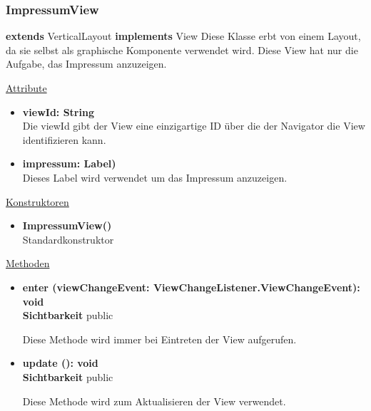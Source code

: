 \newpage
\subsubsection{ImpressumView}\label{ImpressumView}
\textbf{extends}  VerticalLayout \newline
\textbf{implements} View \newline
Diese Klasse erbt von einem Layout, da sie selbst als graphische Komponente verwendet wird. Diese View hat nur die Aufgabe, das Impressum anzuzeigen. \newline

\underline{Attribute}
\begin{itemize}
\itemsep0pt
\item \textbf{viewId: String} \hfill\\ 
Die viewId gibt der View eine einzigartige ID über die der Navigator die View identifizieren kann.

\item \textbf{impressum: Label)} \hfill\\ 
Dieses Label wird verwendet um das Impressum anzuzeigen.

\end{itemize}

\underline{Konstruktoren}
\begin{itemize}
\itemsep0pt
\item \textbf{ImpressumView()} \hfill\\
Standardkonstruktor
\end{itemize}

\underline{Methoden}
\begin{itemize}
\itemsep0pt
\item \textbf{enter (viewChangeEvent: ViewChangeListener.ViewChangeEvent): void}\hfill\\
\textbf{Sichtbarkeit} public

Diese Methode wird immer bei Eintreten der View aufgerufen.

\item \textbf{update (): void}\hfill\\
\textbf{Sichtbarkeit} public

Diese Methode wird zum Aktualisieren der View verwendet.

\end{itemize}
